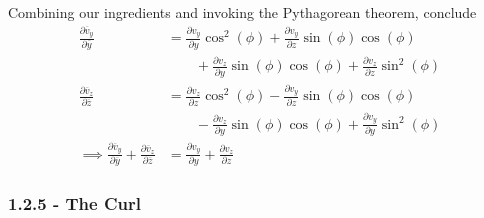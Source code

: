 \documentclass[a4paper]{article}
\begin{document}
Combining our ingredients and invoking the Pythagorean theorem, conclude
\begin{align*}
	\frac{\partial \overline{v}_{y}}{\partial \overline{y}} & = \frac{\partial v_{y}}{\partial y}\cos^{2}\!\left(\phi\right) + \frac{\partial v_{y}}{\partial z}\sin\!\left(\phi\right)\cos\!\left(\phi\right) \\
								& \qquad + \frac{\partial v_{z}}{\partial y}\sin\!\left(\phi\right)\cos\!\left(\phi\right) + \frac{\partial v_{z}}{\partial z}\sin^{2}\!\left(\phi\right) \\
	\frac{\partial \overline{v}_{z}}{\partial \overline{z}} & = \frac{\partial v_{z}}{\partial z}\cos^{2}\!\left(\phi\right) - \frac{\partial v_{y}}{\partial z}\sin\!\left(\phi\right)\cos\!\left(\phi\right) \\
								& \qquad - \frac{\partial v_{z}}{\partial y}\sin\!\left(\phi\right)\cos\!\left(\phi\right) + \frac{\partial v_{y}}{\partial y}\sin^{2}\!\left(\phi\right) \\
	\implies \frac{\partial \overline{v}_{y}}{\partial \overline{y}} + \frac{\partial \overline{v}_{z}}{\partial \overline{z}} & = \frac{\partial v_{y}}{\partial y} + \frac{\partial v_{z}}{\partial z}
\end{align*}

\subsubsection{\textsf{1.2.5 - The Curl}}
\end{document}
